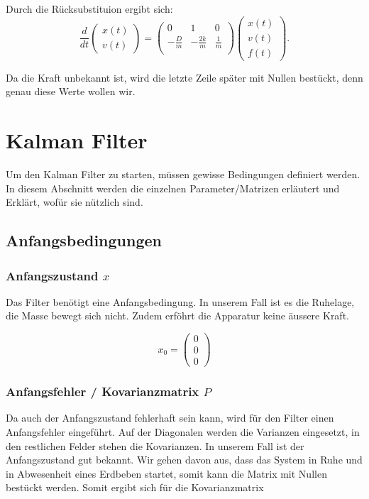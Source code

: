 \documentclass[11pt,a4paper]{article}
\begin{document}
Durch die Rücksubstituion ergibt sich:
\begin{equation}
\frac{d}{dt} \left(\begin{array}{c} x(t) \\ v(t) \end{array}\right) = \left(
 \begin{array}{ccc} 	
0 & 1& 0 \\ 
- \frac{D}{m} &-\frac{2k}{m} & \frac{1} {m}\\
\end{array}\right)  \left(\begin{array}{c} x(t)\\ v(t)\\ f(t) \end{array}\right).
\end{equation}


Da die Kraft unbekannt ist, wird die letzte Zeile später mit Nullen bestückt, denn genau diese Werte wollen wir. 

\section{Kalman Filter}
Um den Kalman Filter zu starten, müssen gewisse Bedingungen definiert werden. In diesem Abschnitt werden die einzelnen Parameter/Matrizen erläutert und Erklärt, wofür sie nützlich sind. 


\subsection{Anfangsbedingungen}
\subsubsection*{Anfangszustand $x$}
Das Filter benötigt eine Anfangsbedingung. In unserem Fall ist es die Ruhelage, die Masse bewegt sich nicht. Zudem erföhrt die Apparatur keine äussere Kraft.

\begin{equation}
{x_0 }= \left( \begin{array}{c} 0\\ 0\\ 0\end{array}\right)
\end{equation} 

\subsubsection*{Anfangsfehler / Kovarianzmatrix $P$}
Da auch der Anfangszustand fehlerhaft sein kann, wird für den Filter einen Anfangsfehler eingeführt. Auf der Diagonalen werden die Varianzen eingesetzt, in den restlichen Felder stehen die Kovarianzen.
In unserem Fall ist der Anfangszustand gut bekannt. Wir gehen davon aus, dass das System in Ruhe und in Abwesenheit eines Erdbeben startet, somit kann die Matrix mit Nullen bestückt werden. Somit ergibt sich für die Kovarianzmatrix
\end{document}
